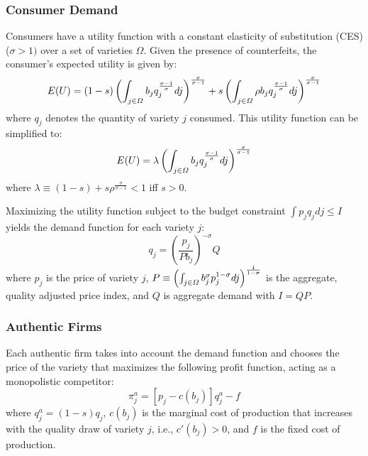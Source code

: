 \documentclass[12pt]{article}
\begin{document}
\subsubsection{Consumer Demand}

Consumers have a utility function with a constant elasticity of substitution (CES) ($\sigma>1)$ over a set of varieties $\varOmega$. Given the
presence of counterfeits, the consumer's expected utility is given by:
\begin{equation}
E(U)=(1-s)\left(\int_{j\text{\ensuremath{\in}}\varOmega}b_{j}q_{j}^{\frac{\sigma-1}{\sigma}}dj\right)^{\frac{\sigma}{\sigma-1}}+s\left(\int_{j\text{\ensuremath{\in}}\varOmega}\rho b_{j}q_{j}^{\frac{\sigma-1}{\sigma}}dj\right)^{\frac{\sigma}{\sigma-1}}
\end{equation}
where $q_{j}$ denotes the quantity of variety $j$ consumed. This utility function can be simplified to:
\begin{equation}
E(U)=\lambda\left(\int_{j\text{\ensuremath{\in}}\varOmega}b_{j}q_{j}^{\frac{\sigma-1}{\sigma}}dj\right)^{\frac{\sigma}{\sigma-1}}
\end{equation}
where $\lambda\equiv(1-s)+s\rho^{\frac{\sigma}{\sigma-1}} < 1$ iff $s>0$. 

Maximizing the utility function subject to the budget constraint $\int p_j q_j dj \leq I $ yields the demand function for each variety $j$:
\begin{equation}
q_{j}=\left(\frac{p_{j}}{Pb_{j}}\right)^{-\sigma}Q
\end{equation}
where $p_{j}$ is the price of variety $j$, $P\equiv\left(\int_{j\text{\ensuremath{\in}}\varOmega}b_{j}^{\sigma}p_{j}^{1-\sigma}dj\right)^{\frac{1}{1-\sigma}}$
is the aggregate, quality adjusted price index, and $Q$ is aggregate demand with $I = QP$.

\subsubsection{Authentic Firms}

Each authentic firm takes into account the demand function and chooses the price of the variety that maximizes the following profit function, acting as a monopolistic competitor:
\begin{equation}
\pi_{j}^{a}=\left[p_{j}-c\left(b_{j}\right)\right]q_{j}^{a}-f
\end{equation}
where $q_{j}^{a}=(1-s)q_{j}$, $c(b_{j})$ is the marginal cost of
production that increases with the quality draw of variety $j$,
i.e., $c'(b_{j})>0$, and $f$ is the fixed cost of production. 
\end{document}
